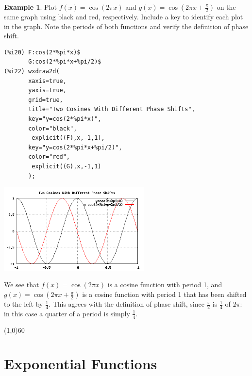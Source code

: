 \documentclass[10.5pt,twoside]{report}
\theoremstyle{definition}
\newtheorem{exmp}{Example}[section]
\begin{document}
\pagebreak
\begin{exmp}

Plot $f(x)=\cos{(2\pi x)}$ and $g(x)=\cos{(2\pi x+\frac{\pi}{2})}$ on the same graph using black and red, respectively.  Include a key to identify each plot in the graph.  Note the periods of both functions and verify the definition of phase shift.\\


\begin{verbatim}
(%i20) F:cos(2*%pi*x)$
       G:cos(2*%pi*x+%pi/2)$
(%i22) wxdraw2d(
       xaxis=true,
       yaxis=true,
       grid=true,
       title="Two Cosines With Different Phase Shifts",
       key="y=cos(2*%pi*x)",
       color="black",
        explicit((F),x,-1,1),
       key="y=cos(2*%pi*x+%pi/2)",
       color="red",
        explicit((G),x,-1,1)
       );
\end{verbatim}

\includegraphics[width=3in]{example_1_2_6}

We see that $f(x)=\cos{(2\pi x)}$ is a cosine function with period 1, and $g(x)=\cos{(2\pi x+\frac{\pi}{2})}$ is a cosine function with period 1 that has been shifted to the left by $\frac{1}{4}$.  This agrees with the definition of phase shift, since $\frac{\pi}{2}$ is $\frac{1}{4}$ of $2\pi$: in this case a quarter of a period is simply $\frac{1}{4}$.


\end{exmp}

\line(1,0){60}
\linethickness{0.5mm}

\pagebreak



\section{Exponential Functions}\label{Exponential Functions}
\end{document}
